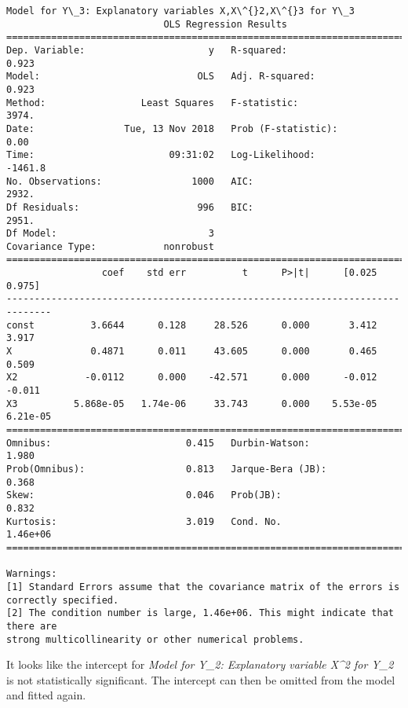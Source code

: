 \documentclass[11pt]{article}
\begin{document}
\begin{Verbatim}[commandchars=\\\{\}]
Model for Y\_3: Explanatory variables X,X\^{}2,X\^{}3 for Y\_3
                            OLS Regression Results                            
==============================================================================
Dep. Variable:                      y   R-squared:                       0.923
Model:                            OLS   Adj. R-squared:                  0.923
Method:                 Least Squares   F-statistic:                     3974.
Date:                Tue, 13 Nov 2018   Prob (F-statistic):               0.00
Time:                        09:31:02   Log-Likelihood:                -1461.8
No. Observations:                1000   AIC:                             2932.
Df Residuals:                     996   BIC:                             2951.
Df Model:                           3                                         
Covariance Type:            nonrobust                                         
==============================================================================
                 coef    std err          t      P>|t|      [0.025      0.975]
------------------------------------------------------------------------------
const          3.6644      0.128     28.526      0.000       3.412       3.917
X              0.4871      0.011     43.605      0.000       0.465       0.509
X2            -0.0112      0.000    -42.571      0.000      -0.012      -0.011
X3          5.868e-05   1.74e-06     33.743      0.000    5.53e-05    6.21e-05
==============================================================================
Omnibus:                        0.415   Durbin-Watson:                   1.980
Prob(Omnibus):                  0.813   Jarque-Bera (JB):                0.368
Skew:                           0.046   Prob(JB):                        0.832
Kurtosis:                       3.019   Cond. No.                     1.46e+06
==============================================================================

Warnings:
[1] Standard Errors assume that the covariance matrix of the errors is correctly specified.
[2] The condition number is large, 1.46e+06. This might indicate that there are
strong multicollinearity or other numerical problems.

    \end{Verbatim}

    It looks like the intercept for \emph{Model for Y\_2: Explanatory
variable X\^{}2 for Y\_2} is not statistically significant. The
intercept can then be omitted from the model and fitted again.
\end{document}
